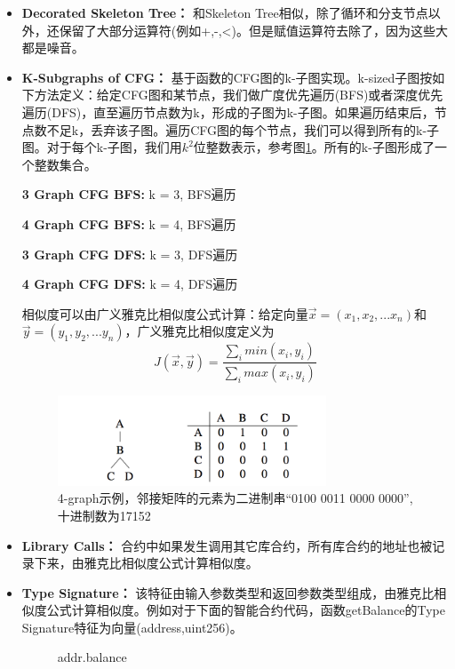 \begin{itemize}
	\item \textbf{Decorated Skeleton Tree：} 和Skeleton Tree相似，除了循环和分支节点以外，还保留了大部分运算符(例如+,-,<)。但是赋值运算符去除了，因为这些大都是噪音。
	\item \textbf{K-Subgraphs of CFG：} 基于函数的CFG图的k-子图实现。k-sized子图按如下方法定义：给定CFG图和某节点，我们做广度优先遍历(BFS)或者深度优先遍历(DFS)，直至遍历节点数为k，形成的子图为k-子图。如果遍历结束后，节点数不足k，丢弃该子图。遍历CFG图的每个节点，我们可以得到所有的k-子图。对于每个k-子图，我们用$k^{2}$位整数表示，参考图\ref{fig:graph-ex}。所有的k-子图形成了一个整数集合。
	
	\textbf{3 Graph CFG BFS:} k = 3, BFS遍历
	
	\textbf{4 Graph CFG BFS:} k = 4, BFS遍历
	
	\textbf{3 Graph CFG DFS:} k = 3, DFS遍历
	
	\textbf{4 Graph CFG DFS:} k = 4, DFS遍历
	
	相似度可以由广义雅克比相似度公式计算：给定向量$\vec{x}=(x_{1},x_{2},...x_{n})$和$\vec{y}=(y_{1},y_{2},...y_{n})$，广义雅克比相似度定义为
	\begin{equation}
	J(\vec{x},\vec{y})=\frac{\sum_imin(x_{i},y_{i})}{\sum_imax(x_{i},y_{i})}
	\end{equation}
	
	
	\begin{figure}[h]
	\centering
	\includegraphics[width=8cm]{./figs/graph-matrix.png}
	\caption{4-graph示例，邻接矩阵的元素为二进制串“0100 0011 0000 0000”, 十进制数为17152}
	\label{fig:graph-ex}
	\end{figure}


	\item \textbf{Library Calls：} 合约中如果发生调用其它库合约，所有库合约的地址也被记录下来，由雅克比相似度公式计算相似度。
	\item \textbf{Type Signature：} 该特征由输入参数类型和返回参数类型组成，由雅克比相似度公式计算相似度。例如对于下面的智能合约代码，函数getBalance的Type Signature特征为向量(address,uint256)。
	
	\begin{figure}[h]
  	\centering
  	\begin{minipage}{.6\linewidth}
    	\begin{algorithm}[H]
  	  		 {
  	  			 {
  	  				\Return addr.balance\;
  	  			}
	  	  	}
    	\end{algorithm}
  	\end{minipage}
	\end{figure}


\end{itemize}

